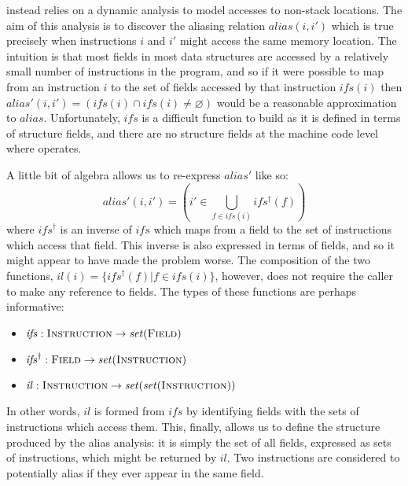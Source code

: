 {\Technique} instead relies on a dynamic analysis to model accesses to
non-stack locations.  The aim of this analysis is to discover the
aliasing relation $\mathit{alias}(i, i')$ which is true precisely when
instructions $i$ and $i'$ might access the same memory location.  The
intuition is that most fields in most data structures are accessed by
a relatively small number of instructions in the program, and so if it
were possible to map from an instruction $i$ to the set of fields
accessed by that instruction $\mathit{ifs}(i)$ then
$\mathit{alias}'(i,i') = (\mathit{ifs}(i) \cap \mathit{ifs}(i) \not=
\varnothing)$ would be a reasonable approximation to $\mathit{alias}$.
Unfortunately, $\mathit{ifs}$ is a difficult function to build as it
is defined in terms of structure fields, and there are no structure
fields at the machine code level where {\technique} operates.

A little bit of algebra allows us to re-express $\mathit{alias}'$ like
so:
\begin{displaymath}
\mathit{alias}'(i, i') = \left(i' \in \bigcup_{f \in \mathit{ifs}(i)} \mathit{ifs^{\dagger}}(f)\right)
\end{displaymath}
where $\mathit{ifs}^{\dagger}$ is an inverse of $\mathit{ifs}$ which
maps from a field to the set of instructions which access that field.
This inverse is also expressed in terms of fields, and so it might
appear to have made the problem worse.  The composition of the two
functions, $\mathit{il}(i) = \{\mathit{ifs}^{\dagger}(f) | f \in
\mathit{ifs}(i)\}$, however, does not require the caller to make any
reference to fields.  The types of these functions are perhaps
informative:
\begin{itemize}
\item $\mathit{ifs}: \textsc{Instruction} \rightarrow \mathit{set}(\textsc{Field})$
\item $\mathit{ifs}^{\dagger}: \textsc{Field} \rightarrow \mathit{set}(\textsc{Instruction})$
\item $\mathit{il}: \textsc{Instruction} \rightarrow \mathit{set}(\mathit{set}(\textsc{Instruction}))$
\end{itemize}
In other words, $\mathit{il}$ is formed from $\mathit{ifs}$ by
identifying fields with the sets of instructions which access them.
This, finally, allows us to define the structure produced by the alias
analysis: it is simply the set of all fields, expressed as sets of
instructions, which might be returned by $\mathit{il}$.  Two
instructions are considered to potentially alias if they ever appear
in the same field.


